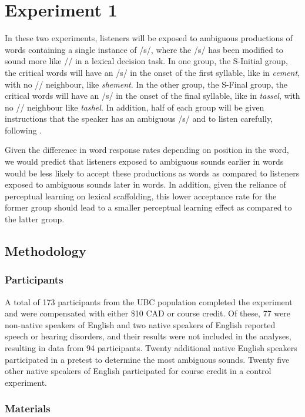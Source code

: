 \section{Experiment 1}

In these two experiments, listeners will be exposed to ambiguous productions of words containing a single instance of /s/, where the /s/ has been modified to sound more like /\textesh/ in a lexical decision task. 
In one group, the S-Initial group, the critical words will have an /s/ in the onset of the first syllable, like in \emph{cement}, with no /\textesh/ neighbour, like \emph{shement}.  
In the other group, the S-Final group, the critical words will have an /s/ in the onset of the final syllable, like in \emph{tassel}, with no /\textesh/ neighbour like \emph{tashel}.  
In addition, half of each group will be given instructions that the speaker has an ambiguous /s/ and to listen carefully, following \citet{Pitt2012}.

Given the difference in word response rates depending on position in the word, we would predict that listeners exposed to ambiguous sounds earlier in words would be less likely to accept these productions as words as compared to listeners exposed to ambiguous sounds later in words.  
In addition, given the reliance of perceptual learning on lexical scaffolding, this lower acceptance rate for the former group should lead to a smaller perceptual learning effect as compared to the latter group.

\subsection{Methodology}

\subsubsection{Participants}

A total of 173 participants from the UBC population completed the experiment and were compensated with either \$10 CAD or course credit.  
Of these, 77 were non-native speakers of English and two native speakers of English reported speech or hearing disorders, and their results were not included in the analyses, resulting in data from 94 participants.
Twenty additional native English speakers participated in a pretest to determine the most ambiguous sounds.  
Twenty five other native speakers of English participated for course credit in a control experiment.

\subsubsection{Materials}

